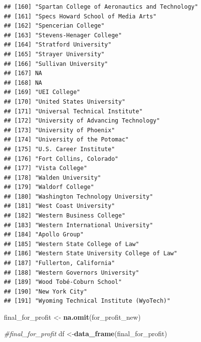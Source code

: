 \documentclass[
]{article}
\newenvironment{Shaded}{\begin{snugshade}}{\end{snugshade}}
\newcommand{\CommentTok}[1]{\textcolor[rgb]{0.56,0.35,0.01}{\textit{#1}}}
\newcommand{\KeywordTok}[1]{\textcolor[rgb]{0.13,0.29,0.53}{\textbf{#1}}}
\newcommand{\NormalTok}[1]{#1}
\newcommand{\StringTok}[1]{\textcolor[rgb]{0.31,0.60,0.02}{#1}}
\begin{document}
\begin{verbatim}
## [160] "Spartan College of Aeronautics and Technology"         
## [161] "Specs Howard School of Media Arts"                     
## [162] "Spencerian College"                                    
## [163] "Stevens-Henager College"                               
## [164] "Stratford University"                                  
## [165] "Strayer University"                                    
## [166] "Sullivan University"                                   
## [167] NA                                                      
## [168] NA                                                      
## [169] "UEI College"                                           
## [170] "United States University"                              
## [171] "Universal Technical Institute"                         
## [172] "University of Advancing Technology"                    
## [173] "University of Phoenix"                                 
## [174] "University of the Potomac"                             
## [175] "U.S. Career Institute"                                 
## [176] "Fort Collins, Colorado"                                
## [177] "Vista College"                                         
## [178] "Walden University"                                     
## [179] "Waldorf College"                                       
## [180] "Washington Technology University"                      
## [181] "West Coast University"                                 
## [182] "Western Business College"                              
## [183] "Western International University"                      
## [184] "Apollo Group"                                          
## [185] "Western State College of Law"                          
## [186] "Western State University College of Law"               
## [187] "Fullerton, California"                                 
## [188] "Western Governors University"                          
## [189] "Wood Tobé-Coburn School"                               
## [190] "New York City"                                         
## [191] "Wyoming Technical Institute (WyoTech)"
\end{verbatim}

\begin{Shaded}
\begin{Highlighting}[]
\NormalTok{final_for_profit <-}\StringTok{ }\KeywordTok{na.omit}\NormalTok{(for_profit_new)}
\end{Highlighting}
\end{Shaded}

\begin{Shaded}
\begin{Highlighting}[]
\CommentTok{#final_for_profit}
\NormalTok{ df <-}\KeywordTok{data_frame}\NormalTok{(final_for_profit)}
\end{Highlighting}
\end{Shaded}
\end{document}
